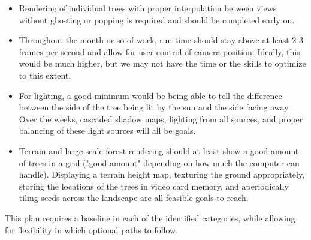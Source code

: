 \documentclass{article}
\begin{document}
\begin {itemize}
\item Rendering of individual trees with proper interpolation between views without ghosting or popping is required and should be completed early on.

\item Throughout the month or so of work, run-time should stay above at least 2-3 frames per second and allow for user control of camera position. Ideally, this would be much higher, but we may not have the time or the skills to optimize to this extent.

\item For lighting, a good minimum would be being able to tell the difference between the side of the tree being lit by the sun and the side facing away. Over the weeks, cascaded shadow maps, lighting from all sources, and proper balancing of these light sources will all be goals.

\item Terrain and large scale forest rendering should at least show a good amount of trees in a grid ("good amount" depending on how much the computer can handle). Displaying a terrain height map, texturing the ground appropriately, storing the locations of the trees in video card memory, and aperiodically tiling seeds across the landscape are all feasible goals to reach.

\end {itemize}

This plan requires a baseline in each of the identified categories, while allowing for flexibility in which optional paths to follow.
\end{document}
